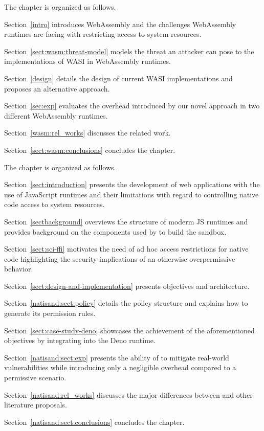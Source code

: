 \smallskip
\noindent The chapter is organized as follows.
\begin{compactitem}
    \item Section~\ref{intro} introduces WebAssembly and the
     challenges WebAssembly runtimes are facing with restricting
     access to system resources.
    \item Section~\ref{sect:wasm:threat-model} models the threat
     an attacker can pose to the implementations of WASI in
     WebAssembly runtimes.
    \item Section~\ref{design} details the design of current
     WASI implementations and proposes an alternative approach.
    \item Section~\ref{sec:exp} evaluates the overhead introduced by
     our novel approach in two different WebAssembly runtimes.
    \item Section~\ref{wasm:rel_works} discusses the related work.
    \item Section~\ref{sect:wasm:conclusions} concludes the chapter.
\end{compactitem}
\medskip

\smallskip
\noindent The chapter is organized as follows.
\begin{compactitem}
    \item Section~\ref{sect:introduction} presents the development of
     web applications with the use of JavaScript runtimes and their
     limitations with regard to controlling native code access to
     system resources.
    \item Section~\ref{sectbackground} overviews the structure of
     moderm JS runtimes and provides background on the components
     used by \natisand to build the sandbox. 
    \item Section~\ref{sect:sci-ffi} motivates the need of
     ad hoc access restrictions for native code highlighting the
     security implications of an otherwise overpermissive behavior.
    \item Section~\ref{sect:design-and-implementation} presents
     \natisand objectives and architecture.
    \item Section~\ref{natisand:sect:policy} details the policy
     structure and explains how to generate its permission rules.
    \item Section~\ref{sect:case-study-deno} showcases the achievement
     of the aforementioned objectives by integrating \natisand into
     the Deno runtime. 
    \item Section~\ref{natisand:sect:exp} presents the ability of
     \natisand to mitigate real-world vulnerabilities while
     introducing only a negligible overhead compared to a permissive
     scenario.
    \item Section~\ref{natisand:rel_works} discusses the major
     differences between \natisand and other literature proposals.
    \item Section~\ref{natisand:sect:conclusions} concludes the chapter.
\end{compactitem}
\medskip

